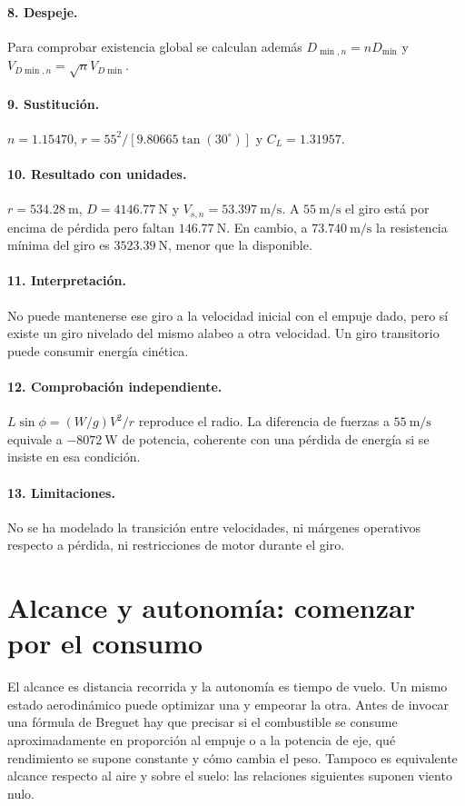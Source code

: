 \paragraph{8. Despeje.} Para comprobar existencia global se calculan además $D_{\min,n}=nD_{\min}$ y $V_{D\min,n}=\sqrt nV_{D\min}$.
\paragraph{9. Sustitución.} $n=1.15470$, $r=55^2/[9.80665\tan(30^\circ)]$ y $C_L=1.31957$.
\paragraph{10. Resultado con unidades.} $r=534.28\ \mathrm m$, $D=4146.77\ \mathrm N$ y $V_{s,n}=53.397\ \mathrm{m/s}$. A $55\ \mathrm{m/s}$ el giro está por encima de pérdida pero faltan $146.77\ \mathrm N$. En cambio, a $73.740\ \mathrm{m/s}$ la resistencia mínima del giro es $3523.39\ \mathrm N$, menor que la disponible.
\paragraph{11. Interpretación.} No puede mantenerse ese giro a la velocidad inicial con el empuje dado, pero sí existe un giro nivelado del mismo alabeo a otra velocidad. Un giro transitorio puede consumir energía cinética.
\paragraph{12. Comprobación independiente.} $L\sin\phi=(W/g)V^2/r$ reproduce el radio. La diferencia de fuerzas a $55\ \mathrm{m/s}$ equivale a $-8072\ \mathrm W$ de potencia, coherente con una pérdida de energía si se insiste en esa condición.
\paragraph{13. Limitaciones.} No se ha modelado la transición entre velocidades, ni márgenes operativos respecto a pérdida, ni restricciones de motor durante el giro.

\section{Alcance y autonomía: comenzar por el consumo}\label{sec:11-breguet}
El alcance es distancia recorrida y la autonomía es tiempo de vuelo. Un mismo estado aerodinámico puede optimizar una y empeorar la otra. Antes de invocar una fórmula de Breguet hay que precisar si el combustible se consume aproximadamente en proporción al empuje o a la potencia de eje, qué rendimiento se supone constante y cómo cambia el peso. Tampoco es equivalente alcance respecto al aire y sobre el suelo: las relaciones siguientes suponen viento nulo.

